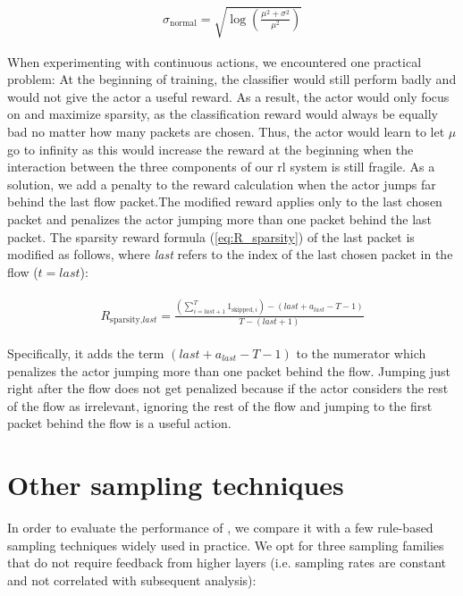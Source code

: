 \documentclass[conference]{IEEEtran}
\begin{document}
\begin{align}
\sigma_{\text{normal}} = \sqrt{\log\left(\frac{\mu^2 + \sigma^2}{\mu^2}\right)}
\end{align}

When experimenting with continuous actions, we encountered one practical problem: At the beginning of training, the classifier would still perform badly and would not give the actor a useful reward. As a result, the actor would only focus on and maximize sparsity, as the classification reward would always be equally bad no matter how many packets are chosen. Thus, the actor would learn to let $\mu$ go to infinity as this would increase the reward at the beginning when the interaction between the three components of our \gls{rl} system is still fragile. As a solution, we add a penalty to the reward calculation when the actor jumps far behind the last flow packet.The modified reward applies only to the last chosen packet and penalizes the actor jumping more than one packet behind the last packet. The sparsity reward formula (\autoref{eq:R_sparsity}) of the last packet is modified as follows, where \textit{last} refers to the index of the last chosen packet in the flow ($t=last$): 

\begin{align}
\begin{split}
R_{\text{sparsity},\textit{last}} = \frac{\left(\sum_{i=\textit{last}+1}^{T} 1_{\text{skipped},i}\right) - \left(\textit{last}+a_{\textit{last}} - T - 1\right)}{T- (\textit{last}+1)}
\end{split}
\label{eq:R_sparsity_last}
\end{align}

Specifically, it adds the term $\left(\textit{last}+a_{\textit{last}} - T - 1\right)$ to the numerator which penalizes the actor jumping more than one packet behind the flow. Jumping just right after the flow does not get penalized because if the actor considers the rest of the flow as irrelevant, ignoring the rest of the flow and jumping to the first packet behind the flow is a useful action. 

\section{Other sampling techniques}
\label{sec:other_sampling_techniques}
In order to evaluate the performance of \ours, we compare it with a few rule-based sampling techniques widely used in practice.
We opt for three sampling families that do not require feedback from higher layers (i.e. sampling rates are constant and not correlated with subsequent analysis): %
\end{document}
